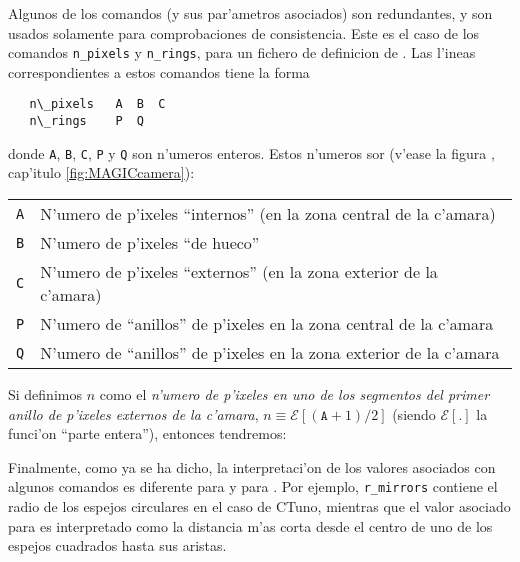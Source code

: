 \ctdefkeywordstbl

\mirrordefCTunotbl

\mirrordefMAGICtbl

Algunos de los comandos (y sus par'ametros asociados) son redundantes,
y son usados solamente para comprobaciones de consistencia. Este es el
caso de los comandos 
\texttt{n\_pixels} y \texttt{n\_rings}, para un fichero de definicion
de \MAGIC.  Las l'ineas correspondientes a estos comandos tiene la forma
%
\begin{verbatim}
   n\_pixels   A  B  C
   n\_rings    P  Q  
\end{verbatim}
%
donde \texttt{A}, \texttt{B}, \texttt{C}, \texttt{P} y \texttt{Q} son
n'umeros enteros. Estos n'umeros sor (v'ease la figura
, cap'itulo \ref{fig:MAGICcamera}):\\
%
\begin{center}
\begin{tabular}{cl}
\texttt{A} & N'umero de p'ixeles ``internos'' (en la zona central de
la c'amara)\\
\texttt{B} & N'umero de p'ixeles ``de hueco''\\
\texttt{C} & N'umero de p'ixeles ``externos'' (en la zona exterior de
la c'amara)\\
\texttt{P} & N'umero de ``anillos'' de p'ixeles en la zona central de
la c'amara\\
\texttt{Q} & N'umero de ``anillos'' de p'ixeles en la zona exterior de
la c'amara\\
\end{tabular}
\end{center}
%
Si definimos $n$ como el \emph{n'umero de p'ixeles en uno de los
  segmentos del primer anillo de p'ixeles externos de la c'amara}, $ n
\equiv \mathcal{E}[(\texttt{A}+1)/2]$ (siendo $\mathcal{E}[\mathord{.}]$
la funci'on ``parte entera''), entonces tendremos:
%
\calcnpixelseq

Finalmente, como ya se ha dicho, la interpretaci'on de los valores
asociados con algunos comandos es diferente para \MAGIC y para
\CTuno.  Por ejemplo, 
\texttt{r\_mirrors} contiene el radio de los espejos circulares en el
caso de CTuno, mientras que el valor asociado para \MAGIC es
interpretado como la distancia m'as corta desde el centro de uno de
los espejos cuadrados hasta sus aristas.

